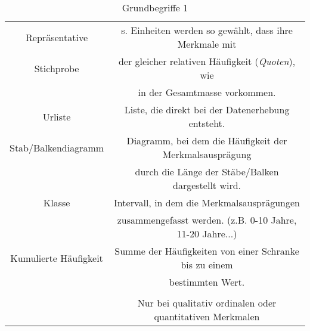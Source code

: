 \documentclass[12pt]{scrartcl}
\begin{document}
\begin{table}[h]
\begin{tabular}{ | c | c | }
        Repräsentative        & s. Einheiten werden so gewählt, dass ihre Merkmale mit    \\
        Stichprobe            & der gleicher relativen Häufigkeit (\emph{Quoten}), wie    \\
                              & in der Gesamtmasse vorkommen.                             \\
        \hline
        Urliste               & Liste, die direkt bei der Datenerhebung entsteht.         \\
        \hline
        Stab/Balkendiagramm   & Diagramm, bei dem die Häufigkeit der Merkmalsausprägung   \\
                              & durch die Länge der Stäbe/Balken dargestellt wird.        \\
        \hline
        Klasse                & Intervall, in dem die Merkmalsausprägungen                \\
                              & zusammengefasst werden. (z.B. 0-10 Jahre, 11-20 Jahre...) \\
        \hline
        Kumulierte Häufigkeit & Summe der Häufigkeiten von einer Schranke bis zu einem    \\
                              & bestimmten Wert.                                          \\&\\
                              & Nur bei qualitativ ordinalen oder quantitativen Merkmalen \\
        \hline
    \end{tabular}
    \caption{Grundbegriffe 1}
\end{table}
\pagebreak
\end{document}
